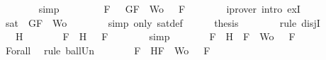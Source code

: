 \begin{isabellebody}
\ \ \ \ \ \ \isamarkupfalse%
\ simp\isanewline
\ \ \ \ \isamarkupfalse%
\ \isamarkupfalse%
\ {\isachardoublequoteopen}{\isasymexists}{\isasymA}{\isachardot}\ {\isasymforall}F\ {\isasymin}\ {\isacharparenleft}{\isacharbraceleft}\isactrlbold {\isasymnot}\ G{\isacharcomma}F{\isacharbraceright}\ {\isasymunion}\ Wo{\isacharparenright}{\isachardot}\ {\isasymA}\ {\isasymTurnstile}\ F{\isachardoublequoteclose}\isanewline
\ \ \ \ \ \ \isamarkupfalse%
\ {\isacharparenleft}iprover\ intro{\isacharcolon}\ exI{\isacharparenright}\isanewline
\ \ \ \ \isamarkupfalse%
\ \isamarkupfalse%
\ {\isachardoublequoteopen}sat\ {\isacharparenleft}{\isacharbraceleft}\isactrlbold {\isasymnot}\ G{\isacharcomma}F{\isacharbraceright}\ {\isasymunion}\ Wo{\isacharparenright}{\isachardoublequoteclose}\isanewline
\ \ \ \ \ \ \isamarkupfalse%
\ {\isacharparenleft}simp\ only{\isacharcolon}\ sat{\isacharunderscore}def{\isacharparenright}\isanewline
\ \ \ \ \isamarkupfalse%
\ {\isacharquery}thesis\isanewline
\ \ \ \ \ \ \isamarkupfalse%
\ {\isacharparenleft}rule\ disjI{}{\isacharparenright}\isanewline
\ \ \isamarkupfalse%
\isanewline
\ \ \ \ \isamarkupfalse%
\ {\isachardoublequoteopen}{\isasymA}\ {\isasymTurnstile}\ H{\isachardoublequoteclose}\isanewline
\ \ \ \ \isamarkupfalse%
\ \isamarkupfalse%
\ {\isachardoublequoteopen}{\isasymforall}F\ {\isasymin}\ {\isacharbraceleft}H{\isacharbraceright}{\isachardot}\ {\isasymA}\ {\isasymTurnstile}\ F{\isachardoublequoteclose}\isanewline
\ \ \ \ \ \ \isamarkupfalse%
\ simp\isanewline
\ \ \ \ \isamarkupfalse%
\ \isamarkupfalse%
\ {\isachardoublequoteopen}{\isasymforall}F\ {\isasymin}\ {\isacharparenleft}{\isacharbraceleft}H{\isacharbraceright}\ {\isasymunion}\ {\isacharparenleft}{\isacharbraceleft}F{\isacharbraceright}\ {\isasymunion}\ Wo{\isacharparenright}{\isacharparenright}{\isachardot}\ {\isasymA}\ {\isasymTurnstile}\ F{\isachardoublequoteclose}\isanewline
\ \ \ \ \ \ \isamarkupfalse%
\ Forall{}\ \isamarkupfalse%
\ {\isacharparenleft}rule\ ball{\isacharunderscore}Un{\isacharparenright}\isanewline
\ \ \ \ \isamarkupfalse%
\ \isamarkupfalse%
\ {\isachardoublequoteopen}{\isasymforall}F\ {\isasymin}\ {\isacharbraceleft}H{\isacharcomma}F{\isacharbraceright}\ {\isasymunion}\ Wo{\isachardot}\ {\isasymA}\ {\isasymTurnstile}\ F{\isachardoublequoteclose}\isanewline

\end{isabellebody}
